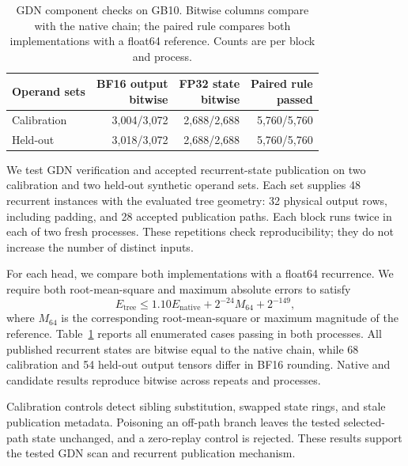 \begin{table}[t]
\centering
\caption{GDN component checks on GB10. Bitwise columns compare with the native chain; the paired rule compares both implementations with a float64 reference. Counts are per block and process.}
\label{tab:gdn-component}
\small
\setlength{\tabcolsep}{3pt}
\begin{tabular}{@{}lrrr@{}}
\toprule
Operand sets & \shortstack{BF16 output\\bitwise} & \shortstack{FP32 state\\bitwise} & \shortstack{Paired rule\\passed} \\
\midrule
Calibration & 3,004/3,072 & 2,688/2,688 & 5,760/5,760 \\
Held-out & 3,018/3,072 & 2,688/2,688 & 5,760/5,760 \\
\bottomrule
\end{tabular}
\end{table}

We test GDN verification and accepted recurrent-state publication on two calibration and two held-out synthetic operand sets. Each set supplies 48 recurrent instances with the evaluated tree geometry: 32 physical output rows, including padding, and 28 accepted publication paths. Each block runs twice in each of two fresh processes. These repetitions check reproducibility; they do not increase the number of distinct inputs.

For each head, we compare both implementations with a float64 recurrence. We require both root-mean-square and maximum absolute errors to satisfy
\begin{equation}
 E_{\mathrm{tree}} \leq 1.10 E_{\mathrm{native}} + 2^{-24} M_{64} + 2^{-149},
\end{equation}
where $M_{64}$ is the corresponding root-mean-square or maximum magnitude of the reference. Table~\ref{tab:gdn-component} reports all enumerated cases passing in both processes. All published recurrent states are bitwise equal to the native chain, while 68 calibration and 54 held-out output tensors differ in BF16 rounding. Native and candidate results reproduce bitwise across repeats and processes.

Calibration controls detect sibling substitution, swapped state rings, and stale publication metadata. Poisoning an off-path branch leaves the tested selected-path state unchanged, and a zero-replay control is rejected. These results support the tested GDN scan and recurrent publication mechanism. 
